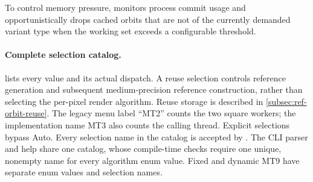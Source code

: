 To control memory pressure,  monitors process commit
usage and opportunistically drops cached orbits that are not of the currently
demanded variant type when the working set exceeds a configurable threshold.

\paragraph{Complete selection catalog.}
 lists every  value and its
actual dispatch. A reuse selection controls reference generation and subsequent
medium-precision reference construction, rather than selecting the per-pixel
render algorithm. Reuse storage is described in \cref{subsec:ref-orbit-reuse}.
The legacy menu label ``MT2'' counts the two square workers; the implementation
name MT3 also counts the calling thread. Explicit selections bypass Auto.
Every selection name in the catalog is accepted by
. The CLI parser and help share one catalog, whose
compile-time checks require one unique, nonempty name for every algorithm enum
value. Fixed and dynamic MT9 have separate enum values and selection names.

